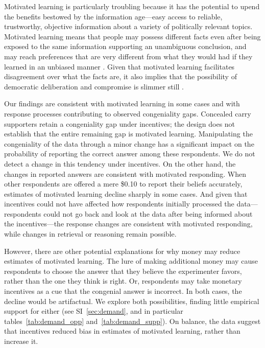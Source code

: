 \documentclass[12pt,letterpaper]{article}
\begin{document}
Motivated learning is particularly troubling because it has the potential to upend the benefits bestowed by the information age---easy access to reliable, trustworthy, objective information about a variety of politically relevant topics. Motivated learning means that people may possess different facts even after being exposed to the same information supporting an unambiguous conclusion, and may reach preferences that are very different from what they would had if they learned in an unbiased manner \citep{gilens2001, hochschild2001}. Given that motivated learning facilitates disagreement over what the facts are, it also implies that the possibility of democratic deliberation and compromise is slimmer still \citep{shapiro2008, muirhead2013}.

Our findings are consistent with motivated learning in some cases and with response processes contributing to observed congeniality gaps. Concealed carry supporters retain a congeniality gap under incentives; the design does not establish that the entire remaining gap is motivated learning. Manipulating the congeniality of the data through a minor change has a significant impact on the probability of reporting the correct answer among these respondents. We do not detect a change in this tendency under incentives. 
On the other hand, the changes in reported answers are consistent with motivated responding. When other respondents are offered a mere \$0.10 to report their beliefs accurately, estimates of motivated learning decline sharply in some cases. And given that incentives could not have affected how respondents initially processed the data---respondents could not go back and look at the data after being informed about the incentives---the response changes are consistent with motivated responding, while changes in retrieval or reasoning remain possible. 

However, there are other potential explanations for why money may reduce estimates of motivated learning. The lure of making additional money may cause respondents to choose the answer that they believe the experimenter favors, rather than the one they think is right. Or, respondents may take monetary incentives as a cue that the congenial answer is incorrect. In both cases, the decline would be artifactual. We explore both possibilities, finding little empirical support for either (see SI~\ref{sec:demand}, and in particular tables~\ref{tab:demand_opp} and~\ref{tab:demand_supp}). On balance, the data suggest that incentives reduced bias in estimates of motivated learning, rather than increase it.
\end{document}
